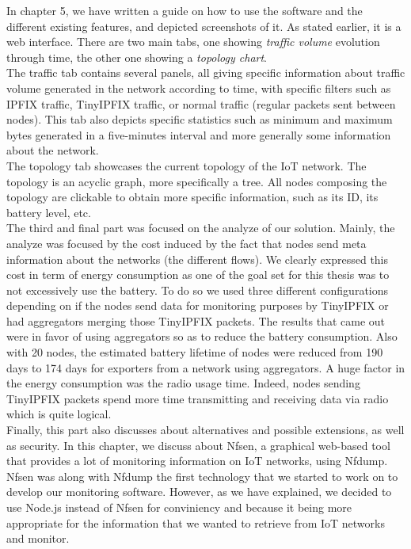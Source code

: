 In chapter 5, we have written a guide on how to use the software and the different existing features, and depicted screenshots of it. As stated earlier, it is a web interface. There are two main tabs, one showing \textit{traffic volume} evolution through time, the other one showing a \textit{topology chart}. \\

The traffic tab contains several panels, all giving specific information about traffic volume generated in the network according to time, with specific filters such as IPFIX traffic, TinyIPFIX traffic, or normal traffic (regular packets sent between nodes). This tab also depicts specific statistics such as minimum and maximum bytes generated in a five-minutes interval and more generally some information about the network. \\

The topology tab showcases the current topology of the IoT network. The topology is an acyclic graph, more specifically a tree. All nodes composing the topology are clickable to obtain more specific information, such as its ID, its battery level, etc.\\

The third and final part was focused on the analyze of our solution. Mainly, the analyze was focused by the cost induced by the fact that nodes send meta information about the networks (the different flows). We clearly expressed this cost in term of energy consumption as one of the goal set for this thesis was to not excessively use the battery. To do so we used three different configurations depending on if the nodes send data for monitoring purposes by TinyIPFIX or had aggregators merging those TinyIPFIX packets. The results that came out were in favor of using aggregators so as to reduce the battery consumption. Also with 20 nodes, the estimated battery lifetime of nodes were reduced from 190 days to 174 days for exporters from a network using aggregators. A huge factor in the energy consumption was the radio usage time. Indeed, nodes sending TinyIPFIX packets spend more time transmitting and receiving data via radio which is quite logical.\\

Finally, this part also discusses about alternatives and possible extensions, as well as security. In this chapter, we discuss about Nfsen, a graphical web-based tool that provides a lot of monitoring information on IoT networks, using Nfdump. Nfsen was along with Nfdump the first technology that we started to work on to develop our monitoring software. However, as we have explained, we decided to use Node.js instead of Nfsen for conviniency and because it being more appropriate for the information that we wanted to retrieve from IoT networks and monitor. \\

